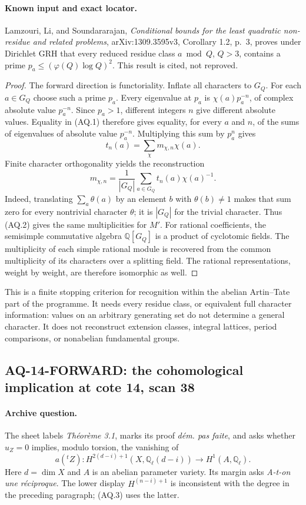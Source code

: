 \documentclass[11pt,a4paper]{article}
\theoremstyle{definition}\newtheorem{definition}[theorem]{Definition}
\theoremstyle{remark}\newtheorem{remark}[theorem]{Remark}
\begin{document}
\paragraph{Known input and exact locator.}
Lamzouri, Li, and Soundararajan, \emph{Conditional bounds for the least
quadratic non-residue and related problems}, arXiv:1309.3595v3,
Corollary 1.2, p.~3, proves under Dirichlet GRH that every reduced residue
class $a\bmod Q$, $Q>3$, contains a prime
$p_a\leq(\varphi(Q)\log Q)^2$. This result is cited, not reproved.

\begin{proof}
The forward direction is functoriality. Inflate all characters to $G_Q$.
For each $a\in G_Q$ choose such a prime $p_a$.
Every eigenvalue at $p_a$ is $\chi(a)p_a^{-n}$, of complex absolute
value $p_a^{-n}$. Since $p_a>1$, different integers $n$ give different
absolute values. Equality in (AQ.1) therefore gives equality,
for every $a$ and $n$, of the sums of eigenvalues of absolute
value $p_a^{-n}$. Multiplying this sum by $p_a^n$ gives
\[
 t_n(a)=\sum_\chi m_{\chi,n}\chi(a).
\]
Finite character orthogonality yields the reconstruction
\[
 m_{\chi,n}=\frac1{|G_Q|}\sum_{a\in G_Q}
             t_n(a)\chi(a)^{-1}.                                \tag{AQ.2}
\]
Indeed, translating $\sum_a\theta(a)$ by an element $b$ with
$\theta(b)\ne1$ makes that sum zero for every nontrivial character
$\theta$; it is $|G_Q|$ for the trivial character. Thus (AQ.2)
gives the same multiplicities for $M'$.
For rational coefficients, the semisimple commutative algebra
$\mathbb Q[G_Q]$ is a product of cyclotomic fields. The
multiplicity of each simple rational module is recovered from
the common multiplicity of its characters over a splitting field.
The rational representations, weight by weight, are therefore
isomorphic as well.
\end{proof}

This is a finite stopping criterion for recognition within the
abelian Artin--Tate part of the programme. It needs every residue
class, or equivalent full character information: values on an
arbitrary generating set do not determine a general character.
It does not reconstruct extension classes, integral lattices,
period comparisons, or nonabelian fundamental groups.

\subsection{AQ-14-FORWARD: the cohomological implication at cote 14, scan 38}
\paragraph{Archive question.}
The sheet labels \emph{Th\'eor\`eme 3.1}, marks its proof
\emph{d\'em. pas faite}, and asks whether $u_Z=0$ implies,
modulo torsion, the vanishing of
\[
 a({}^tZ):H^{2(d-i)+1}(X,\mathbb Q_\ell(d-i))
                     \longrightarrow H^1(A,\mathbb Q_\ell).
                                                               \tag{AQ.3}
\]
Here $d=\dim X$ and $A$ is an abelian parameter variety.
Its margin asks \emph{A-t-on une r\'eciproque}.
The lower display $H^{(n-i)+1}$ is inconsistent with the
degree in the preceding paragraph; (AQ.3) uses the latter.
\end{document}

